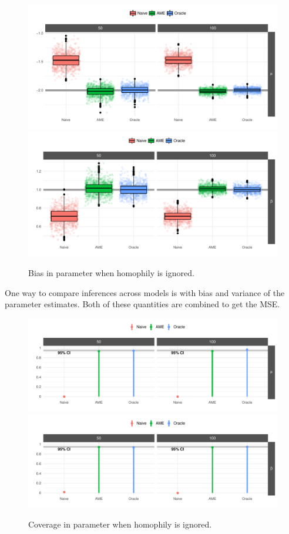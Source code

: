 \begin{figure}
	\centering
	\caption{Bias in parameter when homophily is ignored.}
	\label{fig:ameBias}
	\includegraphics[width=1\textwidth]{ameSimBias_mu.pdf} \\
	\includegraphics[width=1\textwidth]{ameSimBias_beta.pdf}
\end{figure}

One way to compare inferences across models is  with bias and variance of the parameter estimates. Both of these quantities are combined to get the MSE. 

\begin{figure}
	\centering
	\caption{Coverage in parameter when homophily is ignored.}
	\label{fig:ameCalib}
	\includegraphics[width=1\textwidth]{ameSimCover_mu.pdf} \\
	\includegraphics[width=1\textwidth]{ameSimCover_beta.pdf}
\end{figure}

